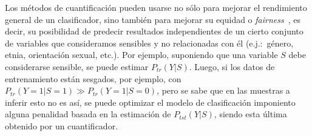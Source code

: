 Los métodos de cuantificación pueden usarse no sólo para mejorar el rendimiento
general de un clasificador, sino también para mejorar su equidad o {\it
fairness}~\cite{biswas2021ensuring}, es decir, su posibilidad de predecir
resultados independientes de un cierto conjunto de variables que consideramos
sensibles y no relacionadas con él (e.j.:~género, etnia, orientación sexual,
etc.). Por ejemplo, suponiendo que una variable $S$ debe considerarse sensible,
se puede estimar $P_{tr}(Y|S)$. Luego, si los datos de entrenamiento están
sesgados, por ejemplo, con $P_{tr}(Y=1|S=1) \gg P_{tr}(Y=1|S=0)$, pero se sabe
que en las muestras a inferir esto no es así, se puede optimizar el modelo de
clasificación imponiento alguna penalidad basada en la estimación de
$P_{tst}(Y|S)$, siendo esta última obtenido por un cuantificador.
